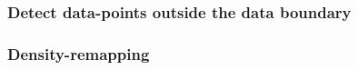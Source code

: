 \subsubsection{Detect data-points outside the data boundary}

\subsubsection{Density-remapping}



\newpage

